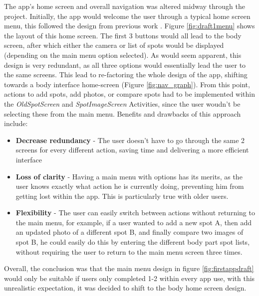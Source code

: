 The app's home screen and overall navigation was altered midway through the project. Initially, the app would welcome the user through a typical home screen menu, this followed the design from previous work . Figure \ref{fig:draft1menu} shows the layout of this home screen. The first 3 buttons would all lead to the body screen, after which either the camera or list of spots would be displayed (depending on the main menu option selected). As would seem apparent, this design is very redundant, as all three options would essentially lead the user to the same screens. This lead to re-factoring the whole design of the app, shifting towards a body interface home-screen (Figure \ref{fig:nav_graph}). From this point, actions to add spots, add photos, or compare spots had to be implemented within the \emph{OldSpotScreen} and \emph{SpotImageScreen} Activities, since the user woudn't be selecting these from the main menu. Benefits and drawbacks of this approach include:
\begin{itemize}
    \item \textbf{Decrease redundancy} - The user doesn't have to go through the same 2 screens for every different action, saving time and delivering a more efficient interface 
    \item \textbf{Loss of clarity} - Having a main menu with options has its merits, as the user knows exactly what action he is currently doing, preventing him from getting lost within the app. This is particularly true with older users.
    \item \textbf{Flexibility} - The user can easily switch between actions without returning to the main menu, for example, if a user wanted to add a new spot A, then  add an updated photo of a different spot B, and finally compare two images of spot B, he could easily do this by entering the different body part spot lists, without requiring the user to return to the main menu screen three times.
\end{itemize}
Overall, the conclusion was that the main menu design in figure \ref{fig:firstappdraft} would only be suitable if users only completed 1-2 within every app use, with this unrealistic expectation, it was decided to shift to the body home screen design.
\clearpage
